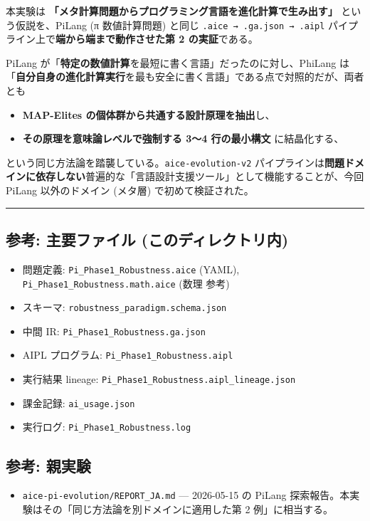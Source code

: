 \documentclass[
]{ltjsarticle}
\providecommand{\tightlist}{%
  \setlength{\itemsep}{0pt}\setlength{\parskip}{0pt}}
\begin{document}
本実験は
\textbf{「メタ計算問題からプログラミング言語を進化計算で生み出す」}
という仮説を、PiLang (π 数値計算問題) と同じ
\texttt{.aice\ →\ .ga.json\ →\ .aipl}
パイプライン上で\textbf{端から端まで動作させた第 2 の実証}である。

PiLang
が「\textbf{特定の数値計算}を最短に書く言語」だったのに対し、PhiLang
は「\textbf{自分自身の進化計算実行}を最も安全に書く言語」である点で対照的だが、両者とも

\begin{itemize}
\tightlist
\item
  \textbf{MAP-Elites の個体群から共通する設計原理を抽出}し、
\item
  \textbf{その原理を意味論レベルで強制する 3〜4 行の最小構文}
  に結晶化する、
\end{itemize}

という同じ方法論を踏襲している。\texttt{aice-evolution-v2}
パイプラインは\textbf{問題ドメインに依存しない}普遍的な「言語設計支援ツール」として機能することが、今回
PiLang 以外のドメイン (メタ層) で初めて検証された。

\begin{center}\rule{0.5\linewidth}{0.5pt}\end{center}

\subsection{参考: 主要ファイル
(このディレクトリ内)}\label{ux53c2ux8003-ux4e3bux8981ux30d5ux30a1ux30a4ux30eb-ux3053ux306eux30c7ux30a3ux30ecux30afux30c8ux30eaux5185}

\begin{itemize}
\tightlist
\item
  問題定義: \texttt{Pi\_Phase1\_Robustness.aice} (YAML),
  \texttt{Pi\_Phase1\_Robustness.math.aice} (数理 参考)
\item
  スキーマ: \texttt{robustness\_paradigm.schema.json}
\item
  中間 IR: \texttt{Pi\_Phase1\_Robustness.ga.json}
\item
  AIPL プログラム: \texttt{Pi\_Phase1\_Robustness.aipl}
\item
  実行結果 lineage: \texttt{Pi\_Phase1\_Robustness.aipl\_lineage.json}
\item
  課金記録: \texttt{ai\_usage.json}
\item
  実行ログ: \texttt{Pi\_Phase1\_Robustness.log}
\end{itemize}

\subsection{参考: 親実験}\label{ux53c2ux8003-ux89aaux5b9fux9a13}

\begin{itemize}
\tightlist
\item
  \texttt{aice-pi-evolution/REPORT\_JA.md} --- 2026-05-15 の PiLang
  探索報告。本実験はその「同じ方法論を別ドメインに適用した第 2
  例」に相当する。
\end{itemize}
\end{document}

